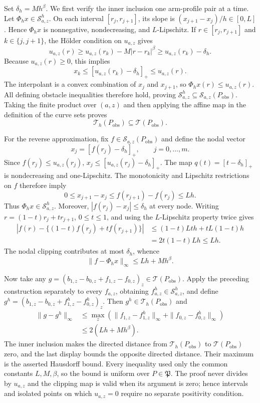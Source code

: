 Set \(\delta_h=Mh^\beta\).  We first verify the inner inclusion one
arm-profile pair at a time.  Let \(\Phi_hx\in\mathcal S^h_{a,z}\).  On each
interval \([r_j,r_{j+1}]\), its slope is
\((x_{j+1}-x_j)/h\in[0,L]\).  Hence \(\Phi_hx\) is nonnegative,
nondecreasing, and \(L\)-Lipschitz.  If
\(r\in[r_j,r_{j+1}]\) and \(k\in\{j,j+1\}\), the H\"older condition on
\(u_{a,z}\) gives
\[
 u_{a,z}(r)\ge u_{a,z}(r_k)-M|r-r_k|^\beta
             \ge u_{a,z}(r_k)-\delta_h.
\]
Because \(u_{a,z}(r)\ge0\), this implies
\[
 x_k\le [u_{a,z}(r_k)-\delta_h]_+\le u_{a,z}(r).
\]
The interpolant is a convex combination of \(x_j\) and \(x_{j+1}\), so
\(\Phi_hx(r)\le u_{a,z}(r)\).  All defining obstacle inequalities therefore
hold, proving
\(\mathcal S^h_{a,z}\subseteq\mathcal S_{a,z}(P_{\mathrm{obs}})\).
Taking the finite product over \((a,z)\) and then applying the affine map in
the definition of the curve sets proves
\[
 \mathcal T_h(P_{\mathrm{obs}})\subseteq\mathcal T(P_{\mathrm{obs}}).
\]

For the reverse approximation, fix
\(f\in\mathcal S_{a,z}(P_{\mathrm{obs}})\) and define the nodal vector
\[
 x_j=[f(r_j)-\delta_h]_+,
 \qquad j=0,\ldots,m.
\]
Since \(f(r_j)\le u_{a,z}(r_j)\),
\(x_j\le[u_{a,z}(r_j)-\delta_h]_+\).  The map
\(q(t)=[t-\delta_h]_+\) is nondecreasing and one-Lipschitz.  The monotonicity
and Lipschitz restrictions on \(f\) therefore imply
\[
 0\le x_{j+1}-x_j
 \le f(r_{j+1})-f(r_j)
 \le Lh.
\]
Thus \(\Phi_hx\in\mathcal S^h_{a,z}\).  Moreover,
\(|f(r_j)-x_j|\le\delta_h\) at every node.  Writing
\(r=(1-t)r_j+tr_{j+1}\), \(0\le t\le1\), and using the
\(L\)-Lipschitz property twice gives
\[
\begin{aligned}
\left|f(r)-\{(1-t)f(r_j)+tf(r_{j+1})\}\right|
&\le(1-t)Lth+tL(1-t)h\\
&=2t(1-t)Lh\le Lh.
\end{aligned}
\]
The nodal clipping contributes at most \(\delta_h\), whence
\[
 \|f-\Phi_hx\|_\infty\le Lh+Mh^\beta.
\]

Now take any
\(g=(b_{1,z}-b_{0,z}+f_{1,z}-f_{0,z})_z\in\mathcal T(P_{\mathrm{obs}})\).
Apply the preceding construction separately to every \(f_{a,z}\), obtaining
\(f^h_{a,z}\in\mathcal S^h_{a,z}\), and define
\(g^h=(b_{1,z}-b_{0,z}+f^h_{1,z}-f^h_{0,z})_z\).  Then
\(g^h\in\mathcal T_h(P_{\mathrm{obs}})\) and
\[
\begin{aligned}
\|g-g^h\|_\infty
&\le\max_z\left(
 \|f_{1,z}-f^h_{1,z}\|_\infty+
 \|f_{0,z}-f^h_{0,z}\|_\infty\right)\\
&\le2(Lh+Mh^\beta).
\end{aligned}
\]
The inner inclusion makes the directed distance from
\(\mathcal T_h(P_{\mathrm{obs}})\) to \(\mathcal T(P_{\mathrm{obs}})\)
zero, and the last display bounds the opposite directed distance.  Their
maximum is the asserted Hausdorff bound.  Every inequality used only the
common constants \(L,M,\beta\), so the bound is uniform over
\(P\in\mathfrak P\).  The proof never divides by \(u_{a,z}\) and the clipping
map is valid when its argument is zero; hence intervals and isolated points
on which \(u_{a,z}=0\) require no separate positivity condition.

